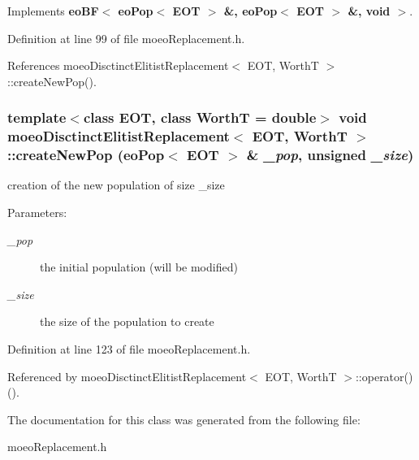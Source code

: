 Implements {\bf eo\-BF$<$ eo\-Pop$<$ EOT $>$ \&, eo\-Pop$<$ EOT $>$ \&, void $>$}.

Definition at line 99 of file moeo\-Replacement.h.

References moeo\-Disctinct\-Elitist\-Replacement$<$ EOT, Worth\-T $>$::create\-New\-Pop().
\subsubsection{\setlength{\rightskip}{0pt plus 5cm}template$<$class EOT, class Worth\-T = double$>$ void {\bf moeo\-Disctinct\-Elitist\-Replacement}$<$ EOT, Worth\-T $>$::create\-New\-Pop ({\bf eo\-Pop}$<$ EOT $>$ \& {\em \_\-pop}, unsigned {\em \_\-size})\hspace{0.3cm}{\tt  [inline, private]}}\label{classmoeoDisctinctElitistReplacement_7aed100016940e4806a7c93c0e22bf85}


creation of the new population of size \_\-size 

\begin{Desc}
\item[Parameters:]
\begin{description}
\item[{\em \_\-pop}]the initial population (will be modified) \item[{\em \_\-size}]the size of the population to create \end{description}
\end{Desc}


Definition at line 123 of file moeo\-Replacement.h.

Referenced by moeo\-Disctinct\-Elitist\-Replacement$<$ EOT, Worth\-T $>$::operator()().

The documentation for this class was generated from the following file:\begin{CompactItemize}
\item 
moeo\-Replacement.h\end{CompactItemize}
